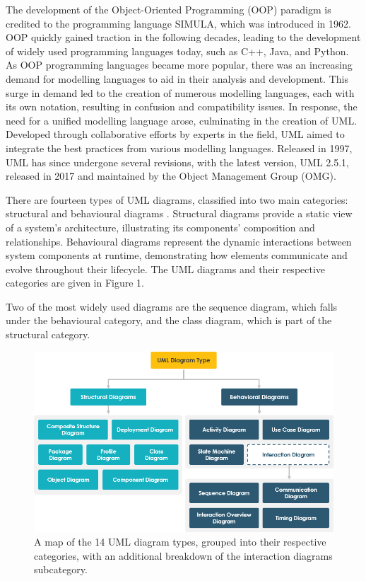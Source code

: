\documentclass{article}
\begin{document}
{The development of the Object-Oriented Programming (OOP) paradigm is credited to the programming language SIMULA, which was introduced in 1962\cite{Simula}. OOP quickly gained traction in the following decades, leading to the development of widely used programming languages today, such as C++, Java, and Python\cite{Seidl_Scholz_Huemer_Kappel_Duffy_2014}. As OOP programming languages became more popular, there was an increasing demand for modelling languages to aid in their analysis and development. This surge in demand led to the creation of numerous modelling languages, each with its own notation, resulting in confusion and compatibility issues\cite{Seidl_Scholz_Huemer_Kappel_Duffy_2014}. In response, the need for a unified modelling language arose, culminating in the creation of UML. Developed through collaborative efforts by experts in the field, UML aimed to integrate the best practices from various modelling languages\cite{Seidl_Scholz_Huemer_Kappel_Duffy_2014}. Released in 1997, UML has since undergone several revisions, with the latest version, UML 2.5.1, released in 2017 and maintained by the Object Management Group (OMG)\cite{OMG_UML}.

There are fourteen types of UML diagrams, classified into two main categories: structural and behavioural diagrams \cite{Seidl_Scholz_Huemer_Kappel_Duffy_2014}. Structural diagrams provide a static view of a system's architecture, illustrating its components' composition and relationships. Behavioural diagrams represent the dynamic interactions between system components at runtime, demonstrating how elements communicate and evolve throughout their lifecycle. The UML diagrams and their respective categories are given in Figure 1. 

Two of the most widely used diagrams are the sequence diagram, which falls under the behavioural category, and the class diagram, which is part of the structural category.

\begin{figure}[H]
    \centering
    \includegraphics[width=1.0\linewidth]{01-uml-diagram-types.png}
    \caption{A map of the 14 UML diagram types, grouped into their respective categories, with an additional breakdown of the interaction diagrams subcategory\cite{visualpara}.}
    \label{fig:UML Diagram Map}
\end{figure}

}
\end{document}
